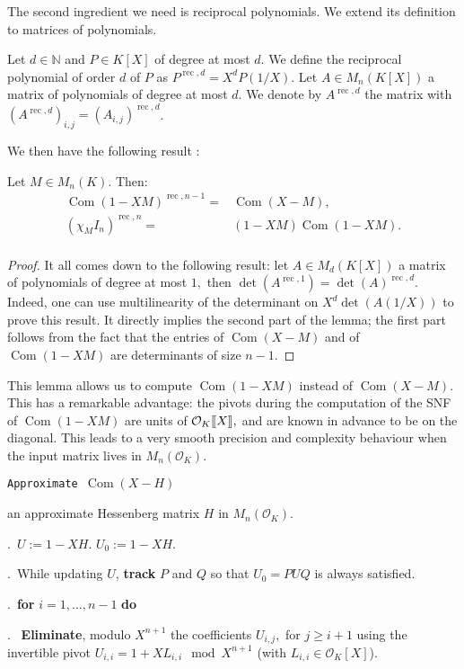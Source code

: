 \documentclass{sig-alternate-05-2015}
\DeclareMathOperator{\com}{Com}
\DeclareMathOperator{\rec}{rec}
\newcommand{\OK}{\mathcal{O}_K}
\newcommand{\llb}{[\mkern-2.5mu[}
\newcommand{\rrb}{]\mkern-2.5mu]}
\begin{document}
The second ingredient we need is reciprocal polynomials.
We extend its definition to matrices of polynomials.
\begin{deftn}
Let $d \in \mathbb{N}$ and $P \in K[X]$ of degree at most $d.$ 
We define the reciprocal polynomial of order $d$ of $P$ as $P^{\rec,d}=X^d P \left( 1/X \right).$
Let $A \in M_n(K[X])$ a matrix of polynomials of degree at most $d.$
We denote by $A^{\rec,d}$ the matrix with $(A^{\rec,d})_{i,j} = (A_{i,j})^{\rec,d}$.
\end{deftn}
We then have the following result :
\begin{lem}
Let $M \in M_n(K).$ Then:
\begin{eqnarray*}
\com(1-XM)^{\rec,n-1}=&\com(X-M), \\
(\chi_M I_n)^{\rec,n}=&(1-XM) \com(1-XM).\\
\end{eqnarray*}
\end{lem}
\begin{proof}
It all comes down to the following result:
let $A \in M_d(K[X])$ a matrix of polynomials of degree at most $1,$
then $\det (A^{\rec,1})=\det(A)^{\rec,d}.$
Indeed, one can use multilinearity of the determinant on $X^d \det(A(1/X))$
to prove this result.
It directly implies the second part of the lemma; the first part follows
from the fact that the entries of $\com(X-M)$ and of $\com(1-XM)$
are determinants of size $n-1$.
\end{proof}

This lemma allows us to compute $\com(1-XM)$ instead of $\com(X-M).$
This has a remarkable advantage: the pivots during the computation of
the SNF of $\com(1-XM)$ are units of $\OK\llb X\rrb,$ and are known
in advance to be on the diagonal. This leads to a very smooth
precision and complexity behaviour when the input matrix lives in 
$M_n(\OK).$ 

\noindent\hrulefill

 {\tt Approximate $\com (X -H)$ }

 an approximate Hessenberg matrix $H$ in $M_n(\OK).$

\smallskip

.\ $U:=1-XH.$ $U_0:=1-XH.$

.\ While updating $U$, \textbf{track} $P$ and $Q$ so that $U_0=PUQ$ is always satisfied.

.\ {\bf for} $i=1,\dots,n-1$ {\bf do} 

.\  \:  \textbf{Eliminate}, modulo $X^{n+1}$ the coefficients $U_{i,j},$ for $j\geq i+1$ 
using the invertible pivot
$U_{i,i}=1+XL_{i,i} \mod X^{n+1}$ (with $L_{i,i} \in \OK[X]$). 
\end{document}
